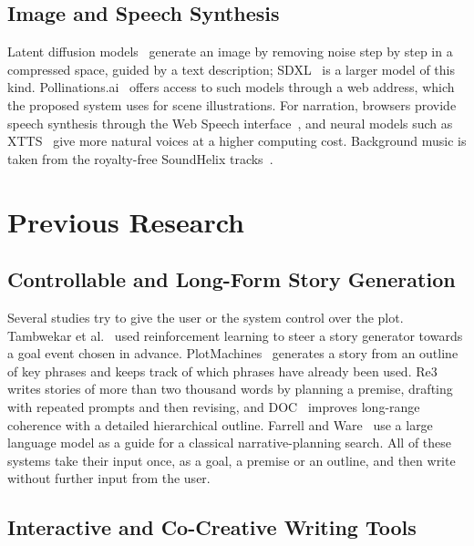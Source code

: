 \subsection{Image and Speech Synthesis}

Latent diffusion models~\cite{rombach2022ldm} generate an image by removing noise step by step in a compressed space, guided by a text description; SDXL~\cite{podell2024sdxl} is a larger model of this kind. Pollinations.ai~\cite{pollinations2024api} offers access to such models through a web address, which the proposed system uses for scene illustrations. For narration, browsers provide speech synthesis through the Web Speech interface~\cite{w3c2024webspeech}, and neural models such as XTTS~\cite{casanova2024xtts} give more natural voices at a higher computing cost. Background music is taken from the royalty-free SoundHelix tracks~\cite{brichta2024soundhelix}.

\section{Previous Research}
\label{sec:lit-previous}

\subsection{Controllable and Long-Form Story Generation}

Several studies try to give the user or the system control over the plot. Tambwekar et al.~\cite{tambwekar2019reward} used reinforcement learning to steer a story generator towards a goal event chosen in advance. PlotMachines~\cite{rashkin2020plotmachines} generates a story from an outline of key phrases and keeps track of which phrases have already been used. Re3~\cite{yang2022re3} writes stories of more than two thousand words by planning a premise, drafting with repeated prompts and then revising, and DOC~\cite{yang2023doc} improves long-range coherence with a detailed hierarchical outline. Farrell and Ware~\cite{farrell2024narrative} use a large language model as a guide for a classical narrative-planning search. All of these systems take their input once, as a goal, a premise or an outline, and then write without further input from the user.

\subsection{Interactive and Co-Creative Writing Tools}

